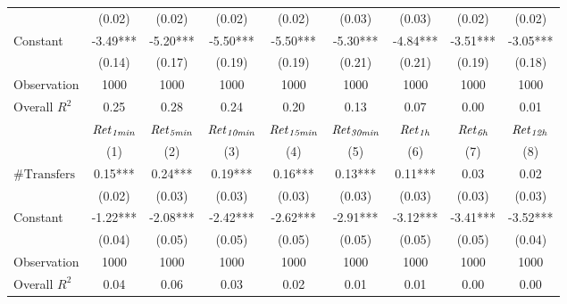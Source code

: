 \begin{tabular}{lcccccccc}
 & (0.02) & (0.02) & (0.02) & (0.02) & (0.03) & (0.03) & (0.02) & (0.02) \\
Constant & -3.49*** & -5.20*** & -5.50*** & -5.50*** & -5.30*** & -4.84*** & -3.51*** & -3.05*** \\
 & (0.14) & (0.17) & (0.19) & (0.19) & (0.21) & (0.21) & (0.19) & (0.18) \\
Observation & 1000 & 1000 & 1000 & 1000 & 1000 & 1000 & 1000 & 1000 \\
Overall $R^2$ & 0.25 & 0.28 & 0.24 & 0.20 & 0.13 & 0.07 & 0.00 & 0.01 \\
\hline
 & ${\it Ret}_{\it 1min}$ & ${\it Ret}_{\it 5min}$ & ${\it Ret}_{\it 10min}$ & ${\it Ret}_{\it 15min}$ & ${\it Ret}_{\it 30min}$ & ${\it Ret}_{\it 1h}$ & ${\it Ret}_{\it 6h}$ & ${\it Ret}_{\it 12h}$ \\
 & (1) & (2) & (3) & (4) & (5) & (6) & (7) & (8) \\
\hline
$\#\text{Transfers}$ & 0.15*** & 0.24*** & 0.19*** & 0.16*** & 0.13*** & 0.11*** & 0.03 & 0.02 \\
 & (0.02) & (0.03) & (0.03) & (0.03) & (0.03) & (0.03) & (0.03) & (0.03) \\
Constant & -1.22*** & -2.08*** & -2.42*** & -2.62*** & -2.91*** & -3.12*** & -3.41*** & -3.52*** \\
 & (0.04) & (0.05) & (0.05) & (0.05) & (0.05) & (0.05) & (0.05) & (0.04) \\
Observation & 1000 & 1000 & 1000 & 1000 & 1000 & 1000 & 1000 & 1000 \\
Overall $R^2$ & 0.04 & 0.06 & 0.03 & 0.02 & 0.01 & 0.01 & 0.00 & 0.00 \\
\hline
\end{tabular}
